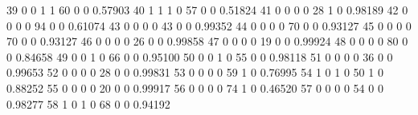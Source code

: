 \documentclass{article}
\begin{document}
\begin{Woutput}
 39    0      0       1       1      60      0        0     0.57903
 40    1      1       1       0      57      0        0     0.51824
 41    0      0       0       0      28      1        0     0.98189
 42    0      0       0       0      94      0        0     0.61074
 43    0      0       0       0      43      0        0     0.99352
 44    0      0       0       0      70      0        0     0.93127
 45    0      0       0       0      70      0        0     0.93127
 46    0      0       0       0      26      0        0     0.99858
 47    0      0       0       0      19      0        0     0.99924
 48    0      0       0       0      80      0        0     0.84658
 49    0      0       1       0      66      0        0     0.95100
 50    0      0       1       0      55      0        0     0.98118
 51    0      0       0       0      36      0        0     0.99653
 52    0      0       0       0      28      0        0     0.99831
 53    0      0       0       0      59      1        0     0.76995
 54    1      0       1       0      50      1        0     0.88252
 55    0      0       0       0      20      0        0     0.99917
 56    0      0       0       0      74      1        0     0.46520
 57    0      0       0       0      54      0        0     0.98277
 58    1      0       1       0      68      0        0     0.94192


\end{Woutput}
\end{document}
